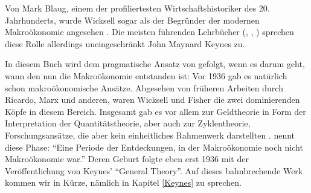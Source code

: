 Von Mark Blaug, einem der profiliertesten Wirtschaftshistoriker des 20. Jahrhunderts, wurde Wicksell sogar als der Begründer der modernen Makroökonomie angesehen \parencite[S. 274]{Blaug1986}. Die meisten führenden Lehrbücher (\textcite[S. 13]{Snowdon2005}, \textcite[S. 795]{Blanchard2003}, \textcite[S. 29]{Samuelson1998}) sprechen diese Rolle allerdings uneingeschränkt John Maynard Keynes zu.

In diesem Buch wird dem pragmatische Ansatz von \textcite{Blanchard2000} gefolgt, wenn es darum geht, wann den nun die Makroökonomie entstanden ist: Vor 1936 gab es natürlich schon makroökonomische Ansätze. Abgesehen von früheren Arbeiten durch Ricardo, Marx und anderen, waren Wicksell und Fisher die zwei dominierenden Köpfe in diesem Bereich. Insgesamt gab es vor allem zur Geldtheorie in Form der Interpretation der Quantitätstheorie, aber auch zur Zyklentheorie, Forschungsansätze, die aber kein einheitliches Rahmenwerk darstellten \parencite[S. 2f]{Blanchard2000}. \textcite[S. 1]{Blanchard2000} nennt diese Phase: "`Eine Periode der Entdeckungen, in der Makroökonomie noch nicht Makroökonomie war."' Deren Geburt folgte eben erst 1936 mit der Veröffentlichung von Keynes' "`General Theory"'. Auf dieses bahnbrechende Werk kommen wir in Kürze, nämlich in Kapitel \ref{Keynes} zu sprechen. 
